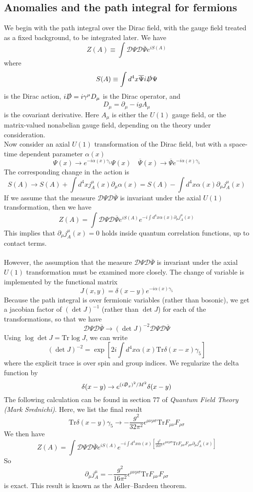 \subsection{Anomalies and the path integral for fermions}
We begin with the path integral over the Dirac field, with the gauge field treated as a fixed background, to be integrated later. We have
\[Z(A) \equiv \int \mathcal{D}\Psi \mathcal{D}\overline{\Psi} e^{iS(A)}\]
where
\[S(A) \equiv \int d^4x \overline{\Psi}i\slashed{D}\Psi \]
is the Dirac action, $i\slashed{D} = i\gamma^{\mu} D_{\mu}$
is the Dirac operator, and
\[D_{\mu} = \partial_{\mu} - igA_{\mu}\]
is the covariant derivative. Here $A_{\mu}$ is either the $U(1)$ gauge field, or the matrix-valued nonabelian gauge field, depending on the theory under consideration.
\\
Now consider an axial $U(1)$ transformation of the Dirac field, but with a space-time dependent parameter $\alpha(x)$
\[\Psi(x) \to e^{-i\alpha(x)\gamma_5}\Psi(x) \quad \overline{\Psi}(x) \to \overline{\Psi} e^{-i\alpha(x)\gamma_5}\]
The corresponding change in the action is
\[S(A) \to S(A) + \int d^4x j^{\mu}_A(x) \partial_{\mu}\alpha(x) = S(A) - \int d^4x \alpha(x) \partial_{\mu}j^{\mu}_A(x) \]
If we assume that the measure $\mathcal{D}\Psi \mathcal{D}\overline{\Psi}$ is invariant under the axial $U(1)$ transformation, then we have
\[Z(A) = \int \mathcal{D}\Psi \mathcal{D}\overline{\Psi} e^{iS(A)} e^{-i \int d^4x \alpha(x)\partial_{\mu}j^{\mu}_A(x) }\]
This implies that $\partial_{\mu}j^{\mu}_A(x) = 0$ holds inside quantum correlation functions, up to contact terms.
\\ \\
However, the assumption that the measure $\mathcal{D}\Psi \mathcal{D}\overline{\Psi}$ is invariant under the axial $U(1)$ transformation must be examined more closely. The change of variable is implemented by the functional matrix
\[J(x,y) = \delta(x-y)e^{-i\alpha(x)\gamma_5} \]
Because the path integral is over fermionic variables (rather than bosonic), we get a jacobian factor of $(\det J)^{-1}$ (rather than $\det J$) for each of the transformations, so that we have
\[\mathcal{D}\Psi \mathcal{D}\overline{\Psi} \to (\det J)^{-2}\mathcal{D}\Psi \mathcal{D}\overline{\Psi}\]
Using $\log \det J = \mathrm{Tr} \log J$, we can write
\[(\det J)^{-2} = \exp \left[2i \int d^4x \alpha(x) \mathrm{Tr}\delta(x-x)\gamma_5 \right]\]
where the explicit trace is over spin and group indices. We regularize the delta function by
\[\delta(x-y) \to e^{(i\slashed{D}_x)^2/M^2} \delta(x-y)\]
The following calculation can be found in section 77 of \emph{Quantum Field Theory (Mark Srednichi)}. Here, we list the final result
\[\mathrm{Tr} \delta(x-y)\gamma_5 \to - \frac{g^2}{32\pi^2} \epsilon^{\mu\nu\rho\sigma} \mathrm{Tr} F_{\mu\nu}F_{\rho\sigma}\]
We then have
\[Z(A) = \int \mathcal{D}\Psi \mathcal{D}\overline{\Psi} e^{iS(A)} e^{-i \int d^4x \alpha(x)[ \frac{g^2}{16\pi^2} \epsilon^{\mu\nu\rho\sigma} \mathrm{Tr} F_{\mu\nu}F_{\rho\sigma} \partial_{\mu}j^{\mu}_A(x)] }\]
So
\[\partial_{\mu} j^{\mu}_A = -\frac{g^2}{16\pi^2} \epsilon^{\mu\nu\rho\sigma} \mathrm{Tr} F_{\mu\nu}F_{\rho\sigma}\]
is exact. This result is known as the Adler–Bardeen theorem.

